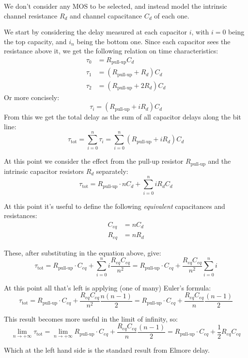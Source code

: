 \documentclass[a4paper,11pt]{article}
\begin{document}
We don't consider any MOS to be selected, and instead model the intrinsic channel resistance $R_d$ and channel capacitance $C_d$ of each one.

We start by considering the delay measured at each capacitor $i$, with $i = 0$ being the top capacity, and $i_n$ being the bottom one.
Since each capacitor sees the resistance above it, we get the following relation on time characteristics:
$$
	\begin{aligned}
		\tau_0 & = R_\text{pull-up} C_d           \\
		\tau_1 & = (R_\text{pull-up} + R_d) C_d   \\
		\tau_2 & = (R_\text{pull-up} + 2 R_d) C_d
	\end{aligned}
$$
Or more concisely:
$$
	\tau_i = (R_\text{pull-up} + i R_d) C_d
$$
From this we get the total delay as the sum of all capacitor delays along the bit line:
$$
	\tau_\text{tot} = \sum_{i = 0}^n \tau_i = \sum_{i = 0}^n (R_\text{pull-up} + i R_d) C_d
$$

At this point we consider the effect from the pull-up resistor $R_\text{pull-up}$ and the intrinsic capacitor resistors $R_d$ separately:
$$
	\tau_\text{tot} = R_\text{pull-up} \cdot n C_d + \sum_{i = 0}^n i R_d C_d
$$

At this point it's useful to define the following \textit{equivalent} capacitances and resistances:
$$
	\begin{aligned}
		C_{eq} & = n C_d \\
		R_{eq} & = n R_d
	\end{aligned}
$$

These, after substituting in the equation above, give:
$$
	\tau_\text{tot} = R_\text{pull-up} \cdot C_{eq} + \sum_{i = 0}^n i \frac{R_{eq} C_{eq}}{n^2}
	= R_\text{pull-up} \cdot C_{eq} + \frac{R_{eq} C_{eq}}{n^2} \sum_{i = 0}^n i
$$

At this point all that's left is applying (one of many) Euler's formula:
$$
	\tau_\text{tot} = R_\text{pull-up} \cdot C_{eq} + \frac{R_{eq} C_{eq}}{n^2} \frac{n (n - 1)}{2} = R_\text{pull-up} \cdot C_{eq} + \frac{R_{eq} C_{eq}}{n} \frac{(n - 1)}{2}
$$

This result becomes more useful in the limit of infinity, so:
$$
	\lim_{n \rightarrow +\infty} \tau_\text{tot} = \lim_{n \rightarrow +\infty} R_\text{pull-up} \cdot C_{eq} + \frac{R_{eq} C_{eq}}{n} \frac{(n - 1)}{2}
	= R_\text{pull-up} \cdot C_{eq} + \frac{1}{2} R_{eq} C_{eq}
$$

Which at the left hand side is the standard result from Elmore delay.
\end{document}
